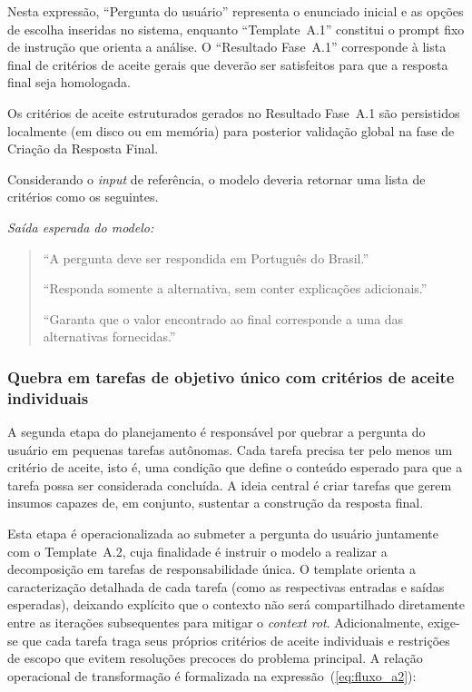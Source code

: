 \documentclass[a4paper,10pt,twocolumn]{article}
\newcommand{\saidaLLM}{%
  \smallskip\noindent\textit{Saída esperada do modelo:}\smallskip\par
}
\begin{document}
Nesta expressão, ``Pergunta do usuário'' representa o enunciado inicial e as opções de escolha inseridas no sistema, enquanto ``Template~A.1'' constitui o prompt fixo de instrução que orienta a análise. O ``Resultado Fase~A.1'' corresponde à lista final de critérios de aceite gerais que deverão ser satisfeitos para que a resposta final seja homologada.

Os critérios de aceite estruturados gerados no Resultado Fase~A.1 são persistidos localmente (em disco ou em memória) para posterior validação global na fase de Criação da Resposta Final.

\begin{exemplo}
Considerando o \textit{input} de referência, o modelo deveria retornar uma lista de critérios como os seguintes.

\saidaLLM

\begin{quote}
``A pergunta deve ser respondida em Português do Brasil.''

``Responda somente a alternativa, sem conter explicações adicionais.''

``Garanta que o valor encontrado ao final corresponde a uma das alternativas fornecidas.''
\end{quote}
\end{exemplo}


\subsubsection{Quebra em tarefas de objetivo único com critérios de aceite individuais} \label{subsec:PlanejamentoA2}

A segunda etapa do planejamento é responsável por quebrar a pergunta do usuário em pequenas tarefas autônomas. Cada tarefa precisa ter pelo menos um critério de aceite, isto é, uma condição que define o conteúdo esperado para que a tarefa possa ser considerada concluída. A ideia central é criar tarefas que gerem insumos capazes de, em conjunto, sustentar a construção da resposta final.

Esta etapa é operacionalizada ao submeter a pergunta do usuário juntamente com o Template~A.2, cuja finalidade é instruir o modelo a realizar a decomposição em tarefas de responsabilidade única. O template orienta a caracterização detalhada de cada tarefa (como as respectivas entradas e saídas esperadas), deixando explícito que o contexto não será compartilhado diretamente entre as iterações subsequentes para mitigar o \textit{context rot}. Adicionalmente, exige-se que cada tarefa traga seus próprios critérios de aceite individuais e restrições de escopo que evitem resoluções precoces do problema principal. A relação operacional de transformação é formalizada na expressão~(\ref{eq:fluxo_a2}):
\end{document}
